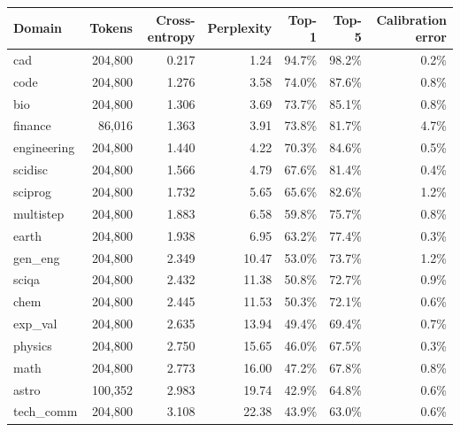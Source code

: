 \begin{tabular}{lrrrrrr}
\toprule
Domain & Tokens & Cross-entropy & Perplexity & Top-1 & Top-5 & Calibration error \\
\midrule
cad & 204,800 & 0.217 & 1.24 & 94.7\% & 98.2\% & 0.2\% \\
code & 204,800 & 1.276 & 3.58 & 74.0\% & 87.6\% & 0.8\% \\
bio & 204,800 & 1.306 & 3.69 & 73.7\% & 85.1\% & 0.8\% \\
finance & 86,016 & 1.363 & 3.91 & 73.8\% & 81.7\% & 4.7\% \\
engineering & 204,800 & 1.440 & 4.22 & 70.3\% & 84.6\% & 0.5\% \\
scidisc & 204,800 & 1.566 & 4.79 & 67.6\% & 81.4\% & 0.4\% \\
sciprog & 204,800 & 1.732 & 5.65 & 65.6\% & 82.6\% & 1.2\% \\
multistep & 204,800 & 1.883 & 6.58 & 59.8\% & 75.7\% & 0.8\% \\
earth & 204,800 & 1.938 & 6.95 & 63.2\% & 77.4\% & 0.3\% \\
gen\_eng & 204,800 & 2.349 & 10.47 & 53.0\% & 73.7\% & 1.2\% \\
sciqa & 204,800 & 2.432 & 11.38 & 50.8\% & 72.7\% & 0.9\% \\
chem & 204,800 & 2.445 & 11.53 & 50.3\% & 72.1\% & 0.6\% \\
exp\_val & 204,800 & 2.635 & 13.94 & 49.4\% & 69.4\% & 0.7\% \\
physics & 204,800 & 2.750 & 15.65 & 46.0\% & 67.5\% & 0.3\% \\
math & 204,800 & 2.773 & 16.00 & 47.2\% & 67.8\% & 0.8\% \\
astro & 100,352 & 2.983 & 19.74 & 42.9\% & 64.8\% & 0.6\% \\
tech\_comm & 204,800 & 3.108 & 22.38 & 43.9\% & 63.0\% & 0.6\% \\
\bottomrule
\end{tabular}
